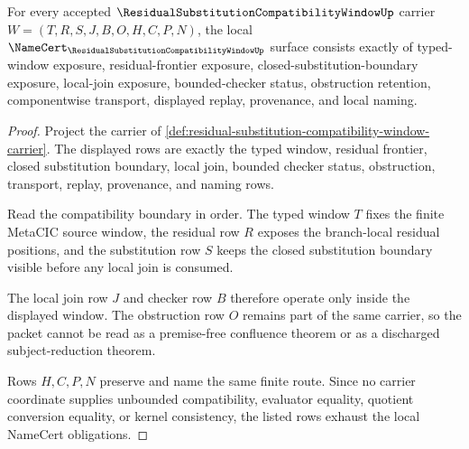 \begin{theorem}
\label{thm:residual-substitution-compatibility-window-namecert-obligations}
For every accepted $\ResidualSubstitutionCompatibilityWindowUp$ carrier $W=(T,R,S,J,B,O,H,C,P,N)$, the local $\NameCert_{\ResidualSubstitutionCompatibilityWindowUp}$ surface consists exactly of typed-window exposure, residual-frontier exposure, closed-substitution-boundary exposure, local-join exposure, bounded-checker status, obstruction retention, componentwise transport, displayed replay, provenance, and local naming.
\end{theorem}
\begin{proof}
Project the carrier of \autoref{def:residual-substitution-compatibility-window-carrier}. The displayed rows are exactly the typed window, residual frontier, closed substitution boundary, local join, bounded checker status, obstruction, transport, replay, provenance, and naming rows.

Read the compatibility boundary in order. The typed window $T$ fixes the finite MetaCIC source window, the residual row $R$ exposes the branch-local residual positions, and the substitution row $S$ keeps the closed substitution boundary visible before any local join is consumed.

The local join row $J$ and checker row $B$ therefore operate only inside the displayed window. The obstruction row $O$ remains part of the same carrier, so the packet cannot be read as a premise-free confluence theorem or as a discharged subject-reduction theorem.

Rows $H,C,P,N$ preserve and name the same finite route. Since no carrier coordinate supplies unbounded compatibility, evaluator equality, quotient conversion equality, or kernel consistency, the listed rows exhaust the local NameCert obligations.
\end{proof}

